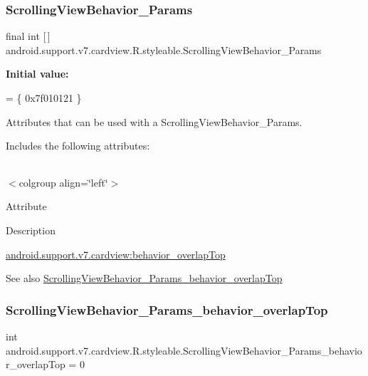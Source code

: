 \subsubsection{\texorpdfstring{Scrolling\+View\+Behavior\+\_\+\+Params}{ScrollingViewBehavior\_Params}}
{\footnotesize\ttfamily final int \mbox{[}$\,$\mbox{]} android.\+support.\+v7.\+cardview.\+R.\+styleable.\+Scrolling\+View\+Behavior\+\_\+\+Params\hspace{0.3cm}{\ttfamily [static]}}

{\bfseries Initial value\+:}
\begin{DoxyCode}
= \{
            0x7f010121
        \}
\end{DoxyCode}
Attributes that can be used with a Scrolling\+View\+Behavior\+\_\+\+Params. 

Includes the following attributes\+:

\tabulinesep=1mm
\begin{longtabu} spread 0pt [c]{*{0}{|X[-1]}|}
\hline
\end{longtabu}
$<$colgroup align=\char`\"{}left\char`\"{}$>$ 

Attribute

Description 

{\ttfamily \hyperlink{classandroid_1_1support_1_1v7_1_1cardview_1_1R_1_1styleable_a8502610687d8661c885b7d6838d9896a}{android.\+support.\+v7.\+cardview\+:behavior\+\_\+overlap\+Top}}

\begin{DoxySeeAlso}{See also}
\hyperlink{classandroid_1_1support_1_1v7_1_1cardview_1_1R_1_1styleable_a8502610687d8661c885b7d6838d9896a}{Scrolling\+View\+Behavior\+\_\+\+Params\+\_\+behavior\+\_\+overlap\+Top} 
\end{DoxySeeAlso}
\mbox{\label{classandroid_1_1support_1_1v7_1_1cardview_1_1R_1_1styleable_a8502610687d8661c885b7d6838d9896a}} 
\subsubsection{\texorpdfstring{Scrolling\+View\+Behavior\+\_\+\+Params\+\_\+behavior\+\_\+overlap\+Top}{ScrollingViewBehavior\_Params\_behavior\_overlapTop}}
{\footnotesize\ttfamily int android.\+support.\+v7.\+cardview.\+R.\+styleable.\+Scrolling\+View\+Behavior\+\_\+\+Params\+\_\+behavior\+\_\+overlap\+Top = 0\hspace{0.3cm}{\ttfamily [static]}}


